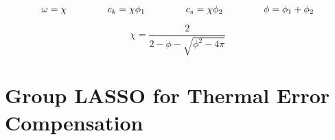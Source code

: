 \begin{equation}
	\omega = \chi \hspace{1.5cm} c_k = \chi \phi_1 \hspace{1.5cm} c_s = \chi \phi_2 \hspace{1.5cm} \phi = \phi_1 + \phi_2
	\label{eq:c_parameter}
\end{equation}

 \begin{equation}
	\chi = \dfrac{2}{2-\phi-\sqrt{\phi^2-4\pi}}
	\label{eq:chi_parameter}
\end{equation}



\section{Group LASSO for Thermal Error Compensation}
\label{sec:algorithm}







 


